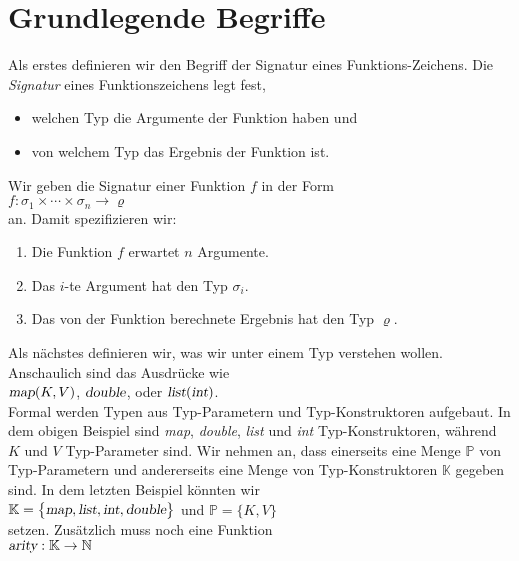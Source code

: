 \section{Grundlegende Begriffe}
Als erstes definieren wir den Begriff der Signatur eines Funktions-Zeichens.
Die \emph{Signatur} eines Funktionszeichens legt fest, 
\begin{itemize}
\item welchen Typ die Argumente der Funktion haben und
\item von welchem Typ das Ergebnis der Funktion ist.
\end{itemize}
Wir geben die Signatur einer Funktion $f$ in der Form
\\[0.2cm]
\hspace*{1.3cm}
$f: \sigma_1 \times \cdots \times \sigma_n \rightarrow \varrho$
\\[0.2cm]
an.  Damit spezifizieren wir:
\begin{enumerate}
\item Die Funktion $f$ erwartet $n$ Argumente.
\item Das $i$-te Argument hat den Typ $\sigma_i$.  
\item Das von der Funktion berechnete Ergebnis hat den Typ $\varrho$.
\end{enumerate}
Als n\"achstes definieren wir, was wir unter einem Typ verstehen wollen.
Anschaulich sind das Ausdr\"ucke wie 
\\[0.2cm]
\hspace*{1.3cm}
$\textsl{map}(K,V)$, \quad $\textsl{double}$, \quad oder \quad $\textsl{list}(\textsl{int})$.
\\[0.2cm]
Formal werden Typen aus Typ-Parametern und Typ-Konstruktoren aufgebaut.
In dem obigen Beispiel sind \textsl{map}, \textsl{double}, \textsl{list} und \textsl{int}
Typ-Konstruktoren, w\"ahrend $K$ und $V$ Typ-Parameter sind.
Wir nehmen an, dass einerseits eine Menge $\mathbb{P}$ von Typ-Parametern und
andererseits eine Menge von Typ-Konstruktoren $\mathbb{K}$ gegeben sind.  In dem letzten Beispiel
k\"onnten wir
\\[0.2cm]
\hspace*{1.3cm}
$\mathbb{K} = \bigl\{ \textsl{map}, \textsl{list}, \textsl{int}, \textsl{double}\bigr\}$
\quad und \quad
$\mathbb{P} = \bigl\{ K, V \bigr\}$
\\[0.2cm]
setzen.  Zus\"atzlich muss noch eine Funktion
\\[0.2cm]
\hspace*{1.3cm}
$\textsl{arity}: \mathbb{K} \rightarrow \mathbb{N}$
